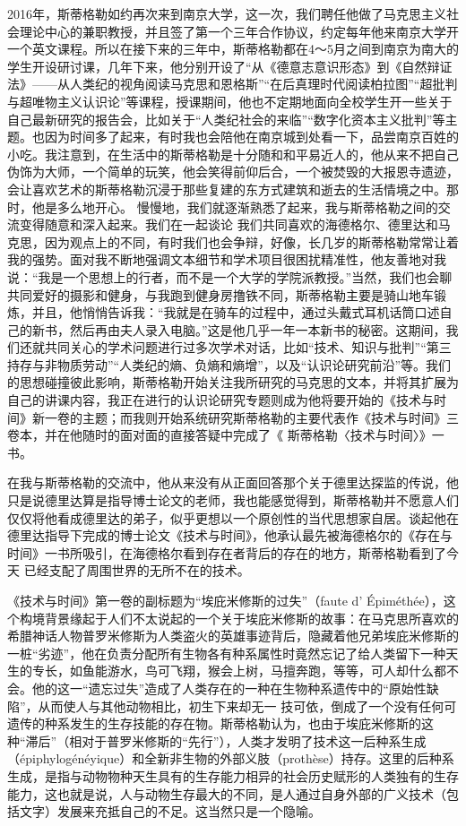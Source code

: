 \documentclass{article}
\begin{document}
\newpage

2016年，斯蒂格勒如约再次来到南京大学，这一次，我们聘任他做了马克思主义社会理论中心的兼职教授，并且签了第一个三年合作协议，约定每年他来南京大学开一个英文课程。所以在接下来的三年中，斯蒂格勒都在4～5月之间到南京为南大的学生开设研讨课，几年下来，他分别开设了“从《德意志意识形态》到《自然辩证法》——从人类纪的视角阅读马克思和恩格斯”“在后真理时代阅读柏拉图”“超批判与超唯物主义认识论”等课程，授课期间，他也不定期地面向全校学生开一些关于自己最新研究的报告会，比如关于“人类纪社会的来临”“数字化资本主义批判”等主题。也因为时间多了起来，有时我也会陪他在南京城到处看一下，品尝南京百姓的小吃。我注意到，在生活中的斯蒂格勒是十分随和和平易近人的，他从来不把自己伪饰为大师，一个简单的玩笑，他会笑得前仰后合，一个被焚毁的大报恩寺遗迹，会让喜欢艺术的斯蒂格勒沉浸于那些复建的东方式建筑和逝去的生活情境之中。那时，他是多么地开心。
慢慢地，我们就逐渐熟悉了起来，我与斯蒂格勒之间的交流变得随意和深入起来。我们在一起谈论
\newpage
我们共同喜欢的海德格尔、德里达和马克思，因为观点上的不同，有时我们也会争辩，好像，长几岁的斯蒂格勒常常让着我的强势。面对我不断地强调文本细节和学术项目很困扰精准性，他友善地对我说：“我是一个思想上的行者，而不是一个大学的学院派教授。”当然，我们也会聊共同爱好的摄影和健身，与我跑到健身房撸铁不同，斯蒂格勒主要是骑山地车锻炼，并且，他悄悄告诉我：“我就是在骑车的过程中，通过头戴式耳机话筒口述自己的新书，然后再由夫人录入电脑。”这是他几乎一年一本新书的秘密。这期间，我们还就共同关心的学术问题进行过多次学术对话，比如“技术、知识与批判”“第三持存与非物质劳动”“人类纪的熵、负熵和熵增”，以及“认识论研究前沿”等。我们的思想碰撞彼此影响，斯蒂格勒开始关注我所研究的马克思的文本，并将其扩展为自己的讲课内容，我正在进行的认识论研究专题则成为他将要开始的《技术与时间》新一卷的主题；而我则开始系统研究斯蒂格勒的主要代表作《技术与时间》三卷本，并在他随时的面对面的直接答疑中完成了《
斯蒂格勒〈技术与时间〉》一书。 

\newpage

在我与斯蒂格勒的交流中，他从来没有从正面回答那个关于德里达探监的传说，他只是说德里达算是指导博士论文的老师，我也能感觉得到，斯蒂格勒并不愿意人们仅仅将他看成德里达的弟子，似乎更想以一个原创性的当代思想家自居。谈起他在德里达指导下完成的博士论文《技术与时间》，他承认最先被海德格尔的《存在与时间》一书所吸引，在海德格尔看到存在者背后的存在的地方，斯蒂格勒看到了今天
已经支配了周围世界的无所不在的技术。 

《技术与时间》第一卷的副标题为“埃庇米修斯的过失”（faute d’ Épiméthée），这个构境背景缘起于人们不太说起的一个关于埃庇米修斯的故事：在马克思所喜欢的希腊神话人物普罗米修斯为人类盗火的英雄事迹背后，隐藏着他兄弟埃庇米修斯的一桩“劣迹”，他在负责分配所有生物各有种系属性时竟然忘记了给人类留下一种天生的专长，如鱼能游水，鸟可飞翔，猴会上树，马擅奔跑，等等，可人却什么都不会。他的这一“遗忘过失”造成了人类存在的一种在生物种系遗传中的“原始性缺陷”，从而使人与其他动物相比，初生下来却无一
\newpage
技可依，倒成了一个没有任何可遗传的种系发生的生存技能的存在物。斯蒂格勒认为，也由于埃庇米修斯的这种“滞后”（相对于普罗米修斯的“先行”），人类才发明了技术这一后种系生成（épiphylogénéyique）和全新非生物的外部义肢（prothèse）持存。这里的后种系生成，是指与动物物种天生具有的生存能力相异的社会历史赋形的人类独有的生存能力，这也就是说，人与动物生存最大的不同，是人通过自身外部的广义技术（包括文字）发展来充抵自己的不足。这当然只是一个隐喻。
 
\end{document}
